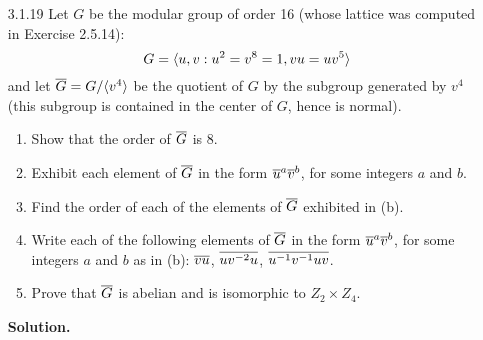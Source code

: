 \begin{enumerate}
\begin{enumerate}
\begin{align*}
               \end{align*}
         \item Let $x = \m{\sigma}$ and $y = \m{\tau}$. It follows that
               $x^4 = y^2 = \m{1}$, $yx = x^{-1}y$, so that $x$ and $y \in\m{G}$ 
               satisy the relations that $r$ and $s \in D_8$ satisy,
               respectively; additionally observe that since $|\m{G}| = 8$ and 
               since every element in $\m{G}$ can be written in the form
               $y^ax^b$ for appropriate integers $a$ and $b$, it follows that
               $$\m{G} = \cyc{x, y : x^4 = y^2 = 1, yx = x^{-1}y} \cong D_8.$$
      \end{enumerate} \qed
   \item[3.1.19]  Let $G$ be the modular group of order 16 (whose lattice was
                  computed in Exercise 2.5.14):
                  $$G = \langle u, v : u^2 = v^8 = 1, vu = uv^5 \rangle$$
                  and let $\overline{G} = G/\langle v^4 \rangle$ be the quotient of $G$ by
                  the subgroup generated by $v^4$ (this subgroup is contained in
                  the center of $G$, hence is normal).
                  \begin{enumerate}
                     \item Show that the order of $\m{G}$ is 8.
                     \item Exhibit each element of $\m{G}$ in the form
                           $\overline{u}^a\overline{v}^b$, for some integers $a$ and $b$.
                     \item Find the order of each of the elements of $\m{G}$
                           exhibited in (b).
                     \item Write each of the following elements of $\m{G}$ in
                           the form $\overline{u}^a\overline{v}^b$, for some integers $a$ and
                           $b$ as in (b): \quad $\overline{vu}$, \quad $\overline{uv^{-2}u}$,
                           \quad $\overline{u^{-1}v^{-1}uv}$.
                     \item Prove that $\m{G}$ is abelian and is isomorphic to
                           $Z_2 \times Z_4$.
                  \end{enumerate}

      \textbf{Solution.}


\end{enumerate}
